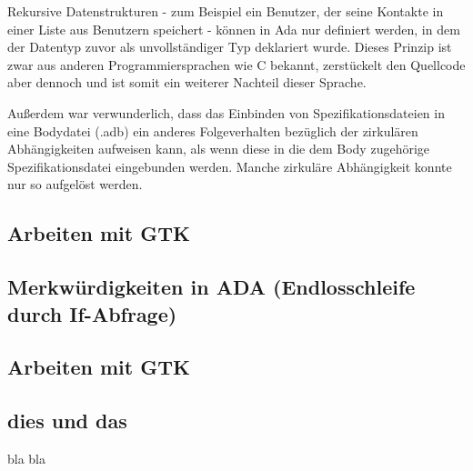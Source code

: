 \documentclass[12pt,a4paper,bibliography=totocnumbered,listof=totocnumbered]{scrartcl}
\begin{document}

Rekursive Datenstrukturen - zum Beispiel ein Benutzer, der seine Kontakte in einer Liste aus Benutzern speichert - können in Ada nur definiert werden, in dem der Datentyp zuvor als unvollständiger Typ deklariert wurde. Dieses Prinzip ist zwar aus anderen Programmiersprachen wie C bekannt, zerstückelt den Quellcode aber dennoch und ist somit ein weiterer Nachteil dieser Sprache.


Außerdem war verwunderlich, dass das Einbinden von Spezifikationsdateien in eine Bodydatei (.adb) ein anderes Folgeverhalten bezüglich der zirkulären Abhängigkeiten aufweisen kann, als wenn diese in die dem Body zugehörige Spezifikationsdatei eingebunden werden. Manche zirkuläre Abhängigkeit konnte nur so aufgelöst werden.

\subsection{Arbeiten mit GTK}

\subsection{Merkwürdigkeiten in ADA (Endlosschleife durch If-Abfrage)}

\subsection{Arbeiten mit GTK}








\subsection{dies und das}
bla bla

\pagebreak


\end{document}
